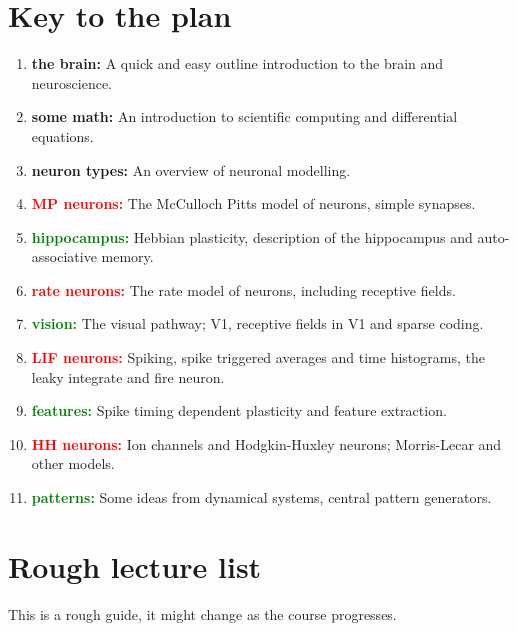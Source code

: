 \documentclass[11pt,a4paper]{scrartcl}
\begin{document}
\section*{Key to the plan}


\begin{enumerate}[label=(\alph*)]
\item \textbf{the brain:} A quick and easy outline introduction to the brain and neuroscience.
\item \textbf{some math:} An introduction to scientific computing and differential equations.
\item \textbf{neuron types:} An overview of neuronal modelling.
\item \textbf{\textcolor{red}{MP neurons:}} The McCulloch Pitts model of neurons, simple synapses.
\item \textbf{\textcolor{green}{hippocampus:}} Hebbian plasticity, description of the hippocampus and auto-associative memory.
\item \textbf{\textcolor{red}{rate neurons:}} The rate model of neurons, including
  receptive fields.
\item \textbf{\textcolor{green}{vision:}} The visual pathway; V1, receptive fields in V1 and sparse coding.
\item \textbf{\textcolor{red}{LIF neurons:}} Spiking, spike triggered averages and time histograms, the leaky integrate and fire neuron.
\item \textbf{\textcolor{green}{features:}} Spike timing dependent plasticity and feature extraction.
\item \textbf{\textcolor{red}{HH neurons:}} Ion channels and Hodgkin-Huxley neurons;
  Morris-Lecar and other models.
\item \textbf{\textcolor{green}{patterns:}} Some ideas from dynamical systems, central pattern generators.
\end{enumerate}

\section*{Rough lecture list}
This is a rough guide, it might change as the course progresses.
\end{document}
